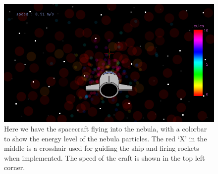 \begin{figure}[H]
  \centering
  \includegraphics[scale=0.5]{../images/10-nebula.png}
  \caption{Here we have the spacecraft flying into the nebula, with a colorbar to show the energy level of the nebula particles.  The red `X' in the middle is a crosshair used for guiding the ship and firing rockets when implemented.  The speed of the craft is shown in the top left corner.}
\end{figure}





